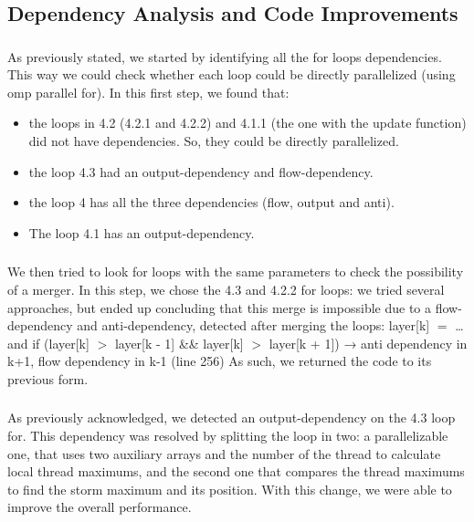 \documentclass[10pt,journal,compsoc]{IEEEtran}
\begin{document}
\subsection{ Dependency Analysis and Code Improvements }

\subsubsection{}
As previously stated, we started by identifying all the for loops dependencies. This way we could check whether each loop could be directly parallelized (using omp parallel for). In this first step, we found that:
\begin{itemize}
\item the loops in 4.2 (4.2.1 and 4.2.2) and 4.1.1 (the one with the update function) did not have dependencies. So, they could be directly parallelized.
\item the loop 4.3 had an output-dependency and flow-dependency.
\item the loop 4 has all the three dependencies (flow, output and anti).
\item The loop 4.1 has an output-dependency.
\end{itemize}

\subsubsection{}
We then tried to look for loops with the same parameters to check the possibility of a merger. In this step, we chose the 4.3 and 4.2.2 for loops: we tried several approaches, but ended up concluding that this merge is impossible due to a flow-dependency and anti-dependency, detected after merging the loops:
layer[k] $=$ … and if (layer[k] $>$ layer[k - 1] \&\& layer[k] $>$ layer[k + 1]) → anti dependency in k+1, flow dependency in k-1
(line 256)
As such, we returned the code to its previous form.

\subsubsection{}
As previously acknowledged, we detected an output-dependency on the 4.3 loop for. This dependency was resolved by splitting the loop in two: a parallelizable one, that uses two auxiliary arrays and the number of the thread to calculate local thread maximums, and the second one that compares the thread maximums to find the storm maximum and its position. With this change, we were able to improve the overall performance.
\end{document}
